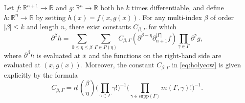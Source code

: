 \documentclass[oneside,hidelinks,indentfirst,10pt]{book}
\begin{document}
\begin{lem}\label{lem:genchain}
Let \(f:\mathbb{R}^{n+1}\rightarrow\mathbb{R}\) and \(g:\mathbb{R}^{n}\rightarrow\mathbb{R}\) both be \(k\) times differentiable, and define \(h:\mathbb{R}^n\rightarrow\mathbb{R}\) by setting \(h(x)=f(x,g(x))\). For any multi-index \(\beta\) of order \(|\beta|\leq k\) and length \(n\), there exist constants \(C_{\beta,\Gamma}\) for which
\begin{equation}\label{eq:holycow}
    \partial^\beta h =\sum_{0\leq\eta\leq\beta}\sum_{\Gamma\in P(\eta)}C_{\beta,\Gamma}(\partial^{\beta-\eta}\partial^{|\Gamma|}_{n+1}f)\prod_{\gamma\in\Gamma}\partial^\gamma g,
\end{equation}
where \(\partial^\beta h\) is evaluated at \(x\) and the functions on the right-hand side are evaluated at \((x,g(x))\). Moreover, the constant \(C_{\beta,\Gamma}\) in \eqref{eq:holycow} is given explicitly by the formula
\begin{equation}\label{eq:cm}
    C_{\beta,\Gamma}=\eta!\binom{\beta}{\eta}\bigg(\prod_{\gamma\in\Gamma}\gamma!\bigg)^{-1}\bigg(\prod_{\gamma\in\mathrm{supp}(\Gamma)}m(\Gamma,\gamma)!\bigg)^{-1}.
\end{equation}
\end{lem}
\end{document}
